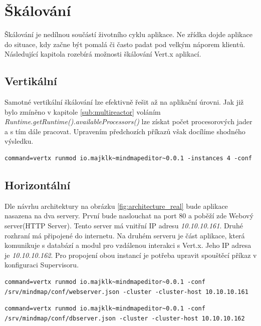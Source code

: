 \section{Škálování}\label{sub:Scaling}

Škálování je nedílnou součástí životního cyklu aplikace. Ne zřídka dojde aplikace do situace, kdy začne být pomalá či často padat pod velkým náporem klientů. Následující kapitola rozebírá možnosti škálování Vert.x aplikací.

\FloatBarrier

\subsection{Vertikální}

Samotné vertikální škálování lze efektivně řešit až na aplikační úrovni. Jak již bylo zmíněno v kapitole \ref{sub:multireactor} voláním \emph{Runtime.getRuntime().availableProcessors()} lze získat počet procesorových jader a s tím dále pracovat. Upravením předchozích příkazů však docílíme shodného výsledku.

\begin{lstlisting}
command=vertx runmod io.majklk~mindmapeditor~0.0.1 -instances 4 -conf
\end{lstlisting}

\subsection{Horizontální}\label{sub:praktCluster}

Dle návrhu architektury na obrázku \ref{fig:architecture_real} bude aplikace nasazena na dva servery. První bude naslouchat na port 80 a poběží zde Webový server(HTTP Server). Tento server má vnitřní IP adresu \emph{10.10.10.161}. Druhé rozhraní má připojené do internetu. Na druhém serveru je část aplikace, která komunikuje s databází a modul pro vzdálenou interakci s Vert.x. Jeho IP adresa je \emph{10.10.10.162}. Pro propojení obou instancí je potřeba upravit spouštěcí příkaz v konfiguraci Supervisoru.

\begin{lstlisting}[caption=Spuštění clusteru na Serveru 1]
command=vertx runmod io.majklk~mindmapeditor~0.0.1 -conf /srv/mindmap/conf/webserver.json -cluster -cluster-host 10.10.10.161
\end{lstlisting}

\begin{lstlisting}[caption=Spuštění clusteru na Serveru 2]
command=vertx runmod io.majklk~mindmapeditor~0.0.1 -conf /srv/mindmap/conf/dbserver.json -cluster -cluster-host 10.10.10.162
\end{lstlisting}

